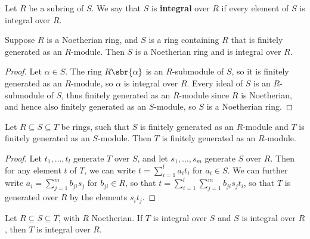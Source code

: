 \begin{definition}
Let $ R $ be a subring of $ S $. We say that $ S $ is \textbf{integral} over $ R $ if every element of $ S $ is integral over $ R $.
\end{definition}

\begin{proposition}
Suppose $ R $ is a Noetherian ring, and $ S $ is a ring containing $ R $ that is finitely generated as an $ R $-module. Then $ S $ is a Noetherian ring and is integral over $ R $.
\end{proposition}

\begin{proof}
Let $ \alpha \in S $. The ring $ R\sbr{\alpha} $ is an $ R $-submodule of $ S $, so it is finitely generated as an $ R $-module, so $ \alpha $ is integral over $ R $. Every ideal of $ S $ is an $ R $-submodule of $ S $, thus finitely generated as an $ R $-module since $ R $ is Noetherian, and hence also finitely generated as an $ S $-module, so $ S $ is a Noetherian ring.
\end{proof}

\begin{lemma}
\label{lem:10.1.6}
Let $ R \subseteq S \subseteq T $ be rings, such that $ S $ is finitely generated as an $ R $-module and $ T $ is finitely generated as an $ S $-module. Then $ T $ is finitely generated as an $ R $-module.
\end{lemma}

\begin{proof}
Let $ t_1, \dots, t_l $ generate $ T $ over $ S $, and let $ s_1, \dots, s_m $ generate $ S $ over $ R $. Then for any element $ t $ of $ T $, we can write $ t = \sum_{i = 1}^l a_it_i $ for $ a_i \in S $. We can further write $ a_i = \sum_{j = 1}^m b_{ji}s_j $ for $ b_{ji} \in R $, so that $ t = \sum_{i = 1}^l \sum_{j = 1}^m b_{ji}s_jt_i $, so that $ T $ is generated over $ R $ by the elements $ s_it_j $.
\end{proof}

\begin{corollary}
Let $ R \subseteq S \subseteq T $, with $ R $ Noetherian. If $ T $ is integral over $ S $ and $ S $ is integral over $ R $, then $ T $ is integral over $ R $.
\end{corollary}

